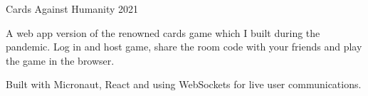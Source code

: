 \cventry
    {Cards Against Humanity} %
    {} %
    {} %
    {2021} %
    {
    \begin{cvitems}
        \item{A web app version of the renowned cards game which I built during the pandemic. Log in and host game, share the room code with your friends and play the game in the browser.}
        \item{Built with Micronaut, React and using WebSockets for live user communications.}
    \end{cvitems}
    }
\vspace{-0.5mm}